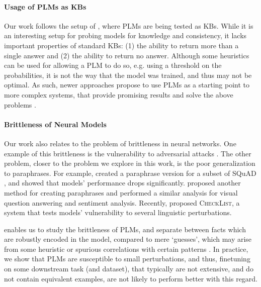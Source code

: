 \paragraph{Usage of PLMs as KBs}
Our work follows the setup of \citet{lama,alpaqa}, where PLMs are being tested as KBs. While it is an interesting setup for probing models for knowledge and consistency, it lacks important properties of standard KBs: (1) the ability to return more than a single answer and (2) the ability to return no answer.
Although some heuristics can be used for allowing a PLM to do so, e.g. using a threshold on the probabilities, it is not the way that the model was trained, and thus may not be optimal.
As such, newer approaches propose to use PLMs as a starting point to more complex systems, that provide promising results and solve the above problems \cite{thorne2020neural}.


\paragraph{Brittleness of Neural Models}
Our work also relates to the problem of brittleness in neural networks. One example of this brittleness is the vulnerability to adversarial attacks \cite{adversarial_attacks,jia2017adversarial}.
The other problem, closer to the problem we explore in this work, is the poor generalization to paraphrases.
For example, \citet{squad-paraphrase} created a paraphrase version for a subset of SQuAD \cite{squad}, and showed that models' performance drops significantly. 
\citet{ribeiro2018semantically} proposed another method for creating paraphrases and performed a similar analysis for visual question answering and sentiment analysis. Recently, \citet{ribeiro-etal-2020-beyond} proposed \textsc{CheckList}, a system that tests models' vulnerability to several linguistic perturbations.

\resource{} enables us to study the brittleness of PLMs, and separate between facts which are robustly encoded in the model, compared to mere `guesses', which may arise from some heuristic or spurious correlations with certain patterns \cite{poerner2020bert}. In practice, we show that PLMs are susceptible to small perturbations, and thus, finetuning on some downstream task (and dataset), that typically are not extensive, and do not contain equivalent examples, are not likely to perform better with this regard.


